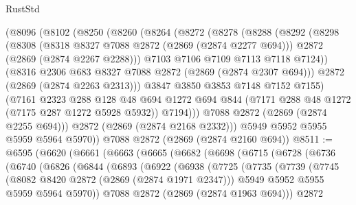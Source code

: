 \begin{lexlean}{RustStd}
\begin{coremodule}
{\begin{coremodule}
{{{{{{{{{{{{    (@8096
      (@8102
        (@8250
          (@8260
            (@8264
              (@8272
                (@8278
                  (@8288
                    (@8292
                      (@8298
                        (@8308
                          (@8318 @8327 @7088 @2872 (@2869 (@2874 @2277 @694)))
                          @2872
                          (@2869 (@2874 @2267 @2288)))
                        @7103
                        @7106
                        @7109
                        @7113
                        @7118
                        @7124))
                    (@8316 @2306 @683 @8327 @7088 @2872 (@2869 (@2874 @2307 @694)))
                    @2872
                    (@2869 (@2874 @2263 @2313)))
                  @3847
                  @3850
                  @3853
                  @7148
                  @7152
                  @7155)
                (@7161
                  @2323
                  @288
                  @128
                  @48
                  @694
                  @1272
                  @694
                  @844
                  (@7171 @288 @48 @1272 (@7175 @287 @1272 @5928 @5932))
                  @7194)))
            @7088
            @2872
            (@2869 (@2874 @2255 @694)))
          @2872
          (@2869 (@2874 @2168 @2332)))
        @5949
        @5952
        @5955
        @5959
        @5964
        @5970))
    @7088
    @2872
    (@2869 (@2874 @2160 @694))
@8511 := @6595
    (@6620
      (@6661
        (@6663
          (@6665
            (@6682
              (@6698
                (@6715
                  (@6728
                    (@6736
                      (@6740
                        (@6826
                          (@6844
                            (@6893
                              (@6922
                                (@6938
                                  (@7725
                                    (@7735
                                      (@7739
                                        (@7745
                                          (@8082 @8420 @2872 (@2869 (@2874 @1971 @2347)))
                                          @5949
                                          @5952
                                          @5955
                                          @5959
                                          @5964
                                          @5970))
                                      @7088
                                      @2872
                                      (@2869 (@2874 @1963 @694)))
                                    @2872
}}}}}}}}}}}}
\end{coremodule}}
\end{coremodule}
\end{lexlean}
